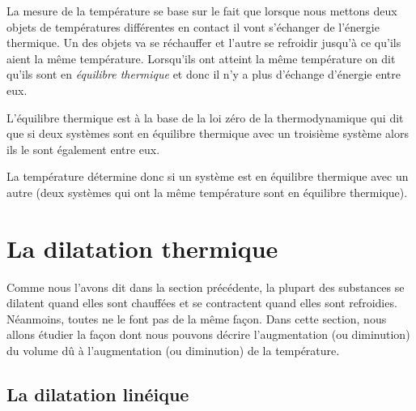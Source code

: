 \documentclass[a4paper,12pt]{book}
\begin{document}
La mesure de la température se base sur le fait que lorsque nous mettons deux objets de températures différentes en contact
il vont s'échanger de l'énergie thermique. Un des objets va se réchauffer et l'autre se refroidir jusqu'à ce qu'ils aient la même température.
Lorsqu'ils ont atteint la même température on dit qu'ils sont en \textit{équilibre thermique} et donc il n'y a plus d'échange d'énergie entre eux.

L'équilibre thermique est à la base de la loi zéro de la thermodynamique qui dit que si deux systèmes sont en équilibre thermique avec un troisième système alors ils le sont également entre eux.

La température détermine donc si un système est en équilibre thermique avec un autre (deux systèmes qui ont la même température sont en équilibre thermique).

\section{La dilatation thermique}

Comme nous l'avons dit dans la section précédente, la plupart des substances se dilatent quand elles sont chauffées
et se contractent quand elles sont refroidies. 
Néanmoins, toutes ne le font pas de la même façon. Dans cette section, nous allons étudier la façon dont 
nous pouvons décrire l'augmentation (ou diminution) du volume dû à l'augmentation (ou diminution) de la température.

\subsection{La dilatation linéique}
\end{document}
